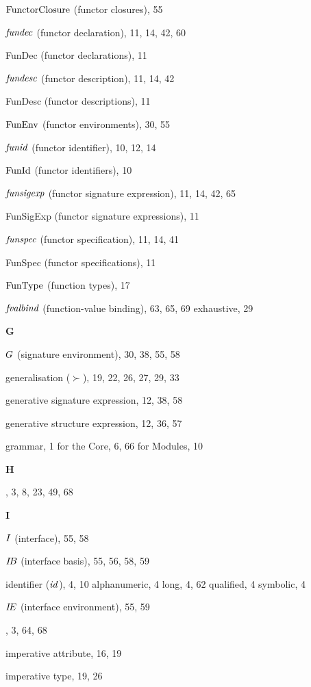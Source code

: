\begin{theindex}
\item ${\rm FunctorClosure}$ (functor closures), 55
\item ${\it fundec}$ (functor declaration), 11, 14, 42, 60
\item FunDec (functor declarations), 11
\item ${\it fundesc}$ (functor description), 11, 14, 42
\item FunDesc (functor descriptions), 11
\item ${\rm FunEnv}$ (functor environments), 30, 55
\item ${\it funid}$ (functor identifier), 10, 12, 14
\item ${\rm FunId}$ (functor identifiers), 10
\item ${\it funsigexp}$ (functor signature expression), 11, 14, 42, 65
\item FunSigExp (functor signature expressions), 11
\item ${\it funspec}$ (functor specification), 11, 14, 41
\item FunSpec (functor specifications), 11
\item ${\rm FunType}$ (function types), 17
\item ${\it fvalbind}$ (function-value binding), 63, 65, 69
\subitem exhaustive, 29
\indexspace
\indexspace
\indexspace
\parbox{65mm}{\hfil{\large\bf G}\hfil}
\indexspace
\item $G$ (signature environment), 30, 38, 55, 58
\item generalisation ($\succ$), 19, 22, 26, 27, 29, 33
\item generative signature expression, 12, 38, 58
\item generative structure expression, 12, 36, 57
\item grammar, 1
\subitem for the Core, 6, 66
\subitem for Modules, 10
\indexspace
\parbox{65mm}{\hfil{\large\bf H}\hfil}
\indexspace
\item \HANDLE, 3, 8, 23, 49, 68
\indexspace
\parbox{65mm}{\hfil{\large\bf I}\hfil}
\indexspace
\item $I$ (interface), 55, 58
\item $\mbox{$I\!B$}$ (interface basis), 55, 56, 58, 59
\item identifier (${\it id}$), 4, 10
\subitem alphanumeric, 4
\subitem long, 4, 62
\subitem qualified, 4
\subitem symbolic, 4
\item $\mbox{$I\!E$}$ (interface environment), 55, 59
\item \IF, 3, 64, 68
\item imperative attribute, 16, 19
\item imperative type, 19, 26

\end{theindex}
